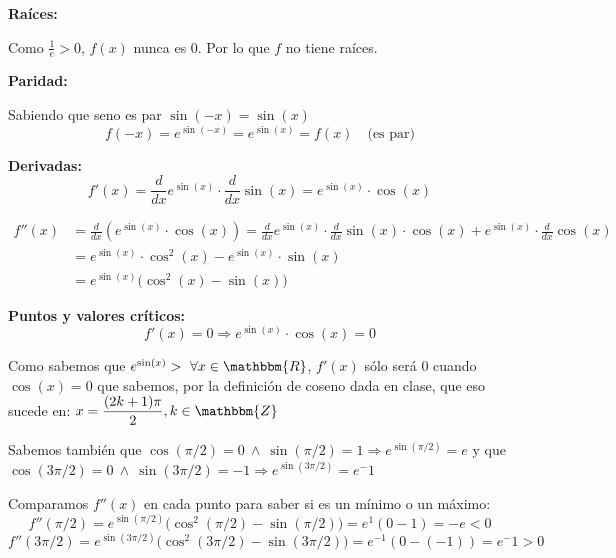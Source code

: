 \documentclass[12pt]{article}
\begin{document}
\begin{enumerate}[\hspace{9px} a)]
        \textbf{Ra\'ices: }\medskip

            Como \(\frac{1}{e}>0\), $f(x)$ nunca es 0. Por lo que \(f\) no tiene ra\'ices.\medskip

        \textbf{Paridad: }\medskip

            Sabiendo que seno es par \(\sin(-x)=\sin(x)\)
            \begin{equation*}
                f(-x) = e^{\sin(-x)} = e^{\sin(x)} = f(x) \quad \text{(es par)}
            \end{equation*}

        \textbf{Derivadas: }
            \begin{equation*}
                f'(x) = \frac{d}{dx}e^{\sin(x)}\cdot \frac{d}{dx}\sin(x) = e^{\sin(x)}\cdot\cos(x)
            \end{equation*}

            \begin{align*}
                f''(x) &= \frac{d}{dx}\left(e^{\sin(x)}\cdot\cos(x)\right) = \frac{d}{dx}e^{\sin(x)}\cdot\frac{d}{dx}\sin(x)\cdot\cos(x)+e^{\sin(x)}\cdot\frac{d}{dx}\cos(x)\\
                &= e^{\sin(x)}\cdot\cos^2(x)-e^{\sin(x)}\cdot\sin(x)\\
                &= e^{\sin(x)}\big(\cos^2(x)-\sin(x)\big)
            \end{align*}

        \textbf{Puntos y valores cr\'iticos: }
            \begin{equation*}
                f'(x)=0 \Rightarrow e^{\sin(x)}\cdot\cos(x)=0
            \end{equation*}

            Como sabemos que \(e^{\sin(x)}> \ \forall x\in\mathbbm{R}\), \(f'(x)\) s\'olo ser\'a 0 cuando \(\cos(x)=0\) que sabemos, por la definici\'on de coseno dada en clase, que eso sucede en: \(\displaystyle x=\frac{(2k+1)\pi}{2},k\in\mathbbm{Z}\)\medskip

            Sabemos tambi\'en que \(\cos(\pi/2)=0 \ \wedge \ \sin(\pi/2)=1 \Rightarrow e^{\sin(\pi/2)}=e\) y que \(\cos(3\pi/2)=0 \ \wedge \ \sin(3\pi/2)=-1 \Rightarrow e^{\sin(3\pi/2)}=e^-1\)\medskip

            Comparamos \(f''(x)\) en cada punto para saber si es un m\'inimo o un m\'aximo:
            \begin{equation*}
                f''(\pi/2)=e^{\sin(\pi/2)}\big(\cos^2(\pi/2)-\sin(\pi/2)\big) = e^1(0-1) = -e<0
            \end{equation*}
            \begin{equation*}
                f''(3\pi/2)=e^{\sin(3\pi/2)}\big(\cos^2(3\pi/2)-\sin(3\pi/2)\big) = e^{-1}(0-(-1)) = e^-1>0
            \end{equation*}


\end{enumerate}
\end{document}
